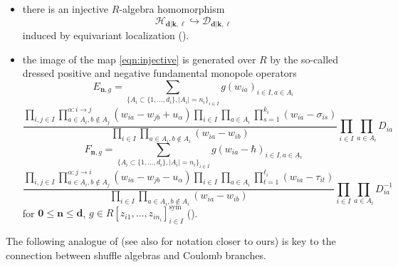 \documentclass{amsart}
\def\DD{{\mathcal{D}}}
\def\CH{{\mathcal{H}}}
\def\sym{\textrm{sym}}
\def\bd{{\mathbf{d}}}
\def\bk{{\mathbf{k}}}
\def\bell{\boldsymbol{\ell}}
\def\bn{{\boldsymbol{n}}}
\def\b0{{\boldsymbol{0}}}
\def\ring{R}
\begin{document}
\begin{itemize}[leftmargin=*]

\item there is an injective $\ring$-algebra homomorphism
\begin{equation}
\label{eqn:injective}
\CH_{\bd|\bk,\bell} \hookrightarrow \DD_{\bd|\bk,\bell}
\end{equation}
induced by equivariant localization (\cite{BFN, BFNQuiver, KWWY}).

\medskip 

\item the image of the map \eqref{eqn:injective} is generated over $\ring$ by the so-called  dressed positive and negative fundamental monopole operators
\begin{equation}
\label{eqn:special e}
E_{\bn,g} = \sum_{\{A_i \subset \{1,\dots,d_i\}, |A_i| = n_i\}_{i \in I}} g(w_{ia})_{i \in I, a \in A_i}
\end{equation} 
$$
\frac {\prod_{i,j \in I} \prod^{\alpha : i \rightarrow j}_{a \in A_i, b \notin A_j} \left(w_{ia}  - w_{jb} + u_\alpha \right) \prod_{i \in I} \prod_{a \in A_i} \prod_{s=1}^{k_i} \left(w_{ia}  - \sigma_{is}\right)}{\prod_{i \in I} \prod_{a \in A_i, b \notin A_i} \left(w_{ia} - w_{ib} \right)} \prod_{i \in I}  \prod_{a \in A_i} D_{ia}
$$
\begin{equation}
\label{eqn:special f}
F_{\bn,g} = \sum_{\{A_i \subset \{1,\dots,d_i\}, |A_i| = n_i\}_{i \in I}} g(w_{ia}-\hbar)_{i \in I, a \in A_i}
\end{equation} 
$$
\frac {\prod_{i,j \in I} \prod^{\alpha : j \rightarrow i}_{a \in A_i, b \notin A_j} \left(w_{ia} - w_{jb} - u_\alpha \right) \prod_{i \in I} \prod_{a \in A_i} \prod_{t=1}^{\ell_i} \left(w_{ia} - \tau_{it} \right)}{\prod_{i \in I} \prod_{a \in A_i, b \notin A_i} \left(w_{ia}-w_{ib}\right)} \prod_{i \in I} \prod_{a \in A_i} D_{ia}^{-1}
$$
for $\b0 \leq \bn \leq \bd$, $g \in \ring[z_{i1},\dots,z_{in_i}]^{\sym}_{i \in I}$ (\cite{BFN, DK, FT, SS, Weekes}).   

\end{itemize}

\medskip 

\noindent The following analogue of \cite[Lemma 2.12]{Tsymbaliuk} (see also \cite{JNCoulomb} for notation closer to ours) is key to the connection between shuffle algebras and Coulomb branches.

\medskip 
\end{document}
